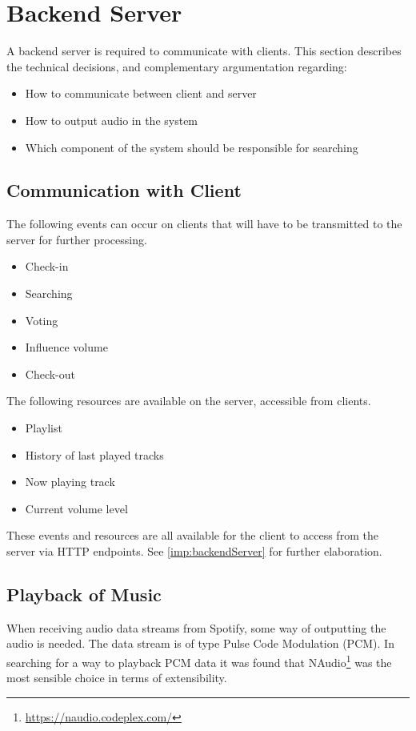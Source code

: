 \section{Backend Server}
\label{techPlat:backendServer}

A backend server is required to communicate with clients. This section describes the technical decisions, and complementary argumentation regarding:
\begin{itemize}
  \item How to communicate between client and server
  \item How to output audio in the system
  \item Which component of the system should be responsible for searching
\end{itemize}

\subsection{Communication with Client}
The following events can occur on clients that will have to be
transmitted to the server for further processing.

\begin{itemize}
\item Check-in
\item Searching
\item Voting
\item Influence volume
\item Check-out
\end{itemize}

The following resources are available on the server, accessible from
clients.

\begin{itemize}
\item Playlist
\item History of last played tracks
\item Now playing track
\item Current volume level
\end{itemize}

These events and resources are all available for the client to access from the server
via HTTP endpoints. See \cref{imp:backendServer} for further elaboration.

\subsection{Playback of Music}
When receiving audio data streams from Spotify, some way of outputting the audio is needed. The data stream is of type Pulse Code Modulation (PCM). In searching for a way to playback PCM data it was found that NAudio\footnote{\url{https://naudio.codeplex.com/}} was the most sensible choice in terms of extensibility.

